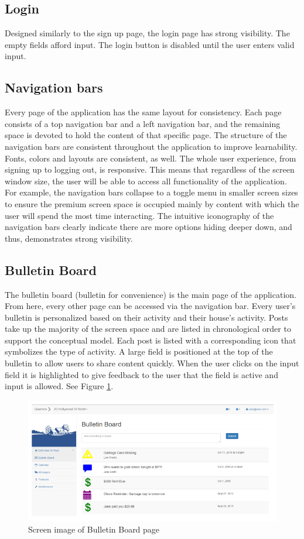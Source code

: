 \documentclass[12pt]{article}
\begin{document}
\subsection{Login}
Designed similarly to the sign up page, the login page has strong visibility. The empty fields afford input. The login button is disabled until the user enters valid input.

\subsection{Navigation bars}
Every page of the application has the same layout for consistency. Each page consists of a top navigation bar and a left navigation bar, and the remaining space is devoted to hold the content of that specific page. The structure of the navigation bars are consistent throughout the application to improve learnability. Fonts, colors and layouts are consistent, as well. The whole user experience, from signing up to logging out, is responsive. This means that regardless of the screen window size, the user will be able to access all functionality of the application. For example, the navigation bars collapse to a toggle menu in smaller screen sizes to ensure the premium screen space is occupied mainly by content with which the user will spend the most time interacting. The intuitive iconography of the navigation bars clearly indicate there are more options hiding deeper down, and thus, demonstrates strong visibility.

\subsection{Bulletin Board}
The bulletin board (bulletin for convenience) is the main page of the application. From here, every other page can be accessed via the navigation bar. Every user's bulletin is personalized based on their activity and their house's activity. Posts take up the majority of the screen space and are listed in chronological order to support the conceptual model. Each post is listed with a corresponding icon that symbolizes the type of activity. A large field is positioned at the top of the bulletin to allow users to share content quickly. When the user clicks on the input field it is highlighted to give feedback to the user that the field is active and input is allowed. See Figure \ref{fig:bulletin}.

\begin{figure}[h]
\centering
\includegraphics[width=\textwidth]{bulletin}
\caption{Screen image of Bulletin Board page}
\label{fig:bulletin}
\end{figure}
\end{document}
